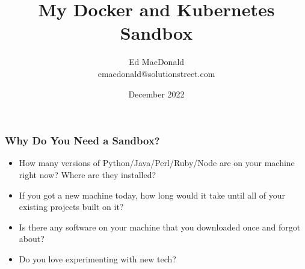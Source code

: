 
\usepackage[utf8]{inputenc}
\usepackage{minted}
\usepackage{listings}
\usepackage{graphicx}
\usepackage{xcolor}
\usepackage{adjustbox}

\usepackage[T1]{fontenc}


\hypersetup{colorlinks,linkcolor=,urlcolor=links}

\setlength{\columnseprule}{0.4pt}


\title[Sandbox]{My Docker and Kubernetes Sandbox}
\author[Ed MacDonald]{Ed MacDonald\\emacdonald@solutionstreet.com}
\date{December 2022}





    \frame{\titlepage}

    \begin{frame}
      \frametitle{Why Do You Need a Sandbox?}
      \begin{itemize}
      \item<2->How many versions of Python/Java/Perl/Ruby/Node are on your
        machine right now? Where are they installed?
      \item<3->If you got a new machine today, how long would it take until all
        of your existing projects built on it?
      \item<4->Is there any software on your machine that you downloaded once and forgot about?
      \item<5->Do you love experimenting with new tech?
      \end{itemize}
    \end{frame}

